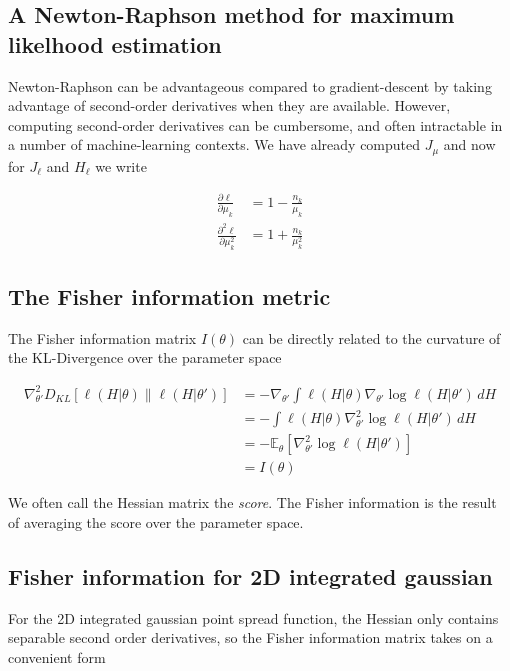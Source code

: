 \documentclass{ucetd}
\begin{document}
\subsection{A Newton-Raphson method for maximum likelhood estimation}

Newton-Raphson can be advantageous compared to gradient-descent by taking advantage of second-order derivatives when they are available. However, computing second-order derivatives can be cumbersome, and often intractable in a number of machine-learning contexts.  We have already computed $J_{\mu}$ and now for $J_{\ell}$ and $H_{\ell}$ we write

\begin{align*}
\frac{\partial\ell}{\partial \mu_{k}} &= 1 - \frac{n_{k}}{\mu_{k}}\\
\frac{\partial^{2}\ell}{\partial \mu_{k}^{2}} &= 1 + \frac{n_{k}}{\mu_{k}^{2}}
\end{align*}


\subsection{The Fisher information metric}

The Fisher information matrix $I(\theta)$ can be directly related to the curvature of the KL-Divergence over the parameter space

\begin{align*}
\nabla^2_{\theta'} D_{KL}[\ell(H|\theta) \parallel \ell(H|\theta')] 
&= - \nabla_{\theta'} \int \ell(H|\theta) \nabla_{\theta'}  \log \ell(H|\theta') \, dH \\ 
&= - \int \ell(H|\theta) \nabla^2_{\theta'}  \log \ell(H|\theta') \, dH \\
&= - \mathbb{E}_{\theta}[\nabla^2_{\theta'} \log \ell(H|\theta')] \\
&= I(\theta)
\end{align*}


We often call the Hessian matrix the \emph{score}. The Fisher information is the result of averaging the score over the parameter space. 

\subsection{Fisher information for 2D integrated gaussian}

For the 2D integrated gaussian point spread function, the Hessian only contains separable second order derivatives, so the Fisher information matrix takes on a convenient form
\end{document}

